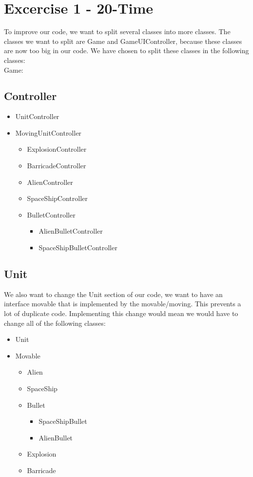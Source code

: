 \section*{Excercise 1 - 20-Time}
To improve our code, we want to split several classes into more classes. The classes we want to split are Game and GameUIController, because these classes are now too big in our code. We have chosen to split these classes in the following classes:\\
Game:\newline
\subsection*{Controller}
\begin{itemize}
	\item UnitController
	\item MovingUnitController
	\begin{itemize}
	\item ExplosionController
	\item BarricadeController	
	\item AlienController
	\item SpaceShipController
	\item BulletController
		\begin{itemize}
			\item AlienBulletController
			\item SpaceShipBulletController
		\end{itemize}
	\end{itemize}
\end{itemize}
\subsection*{Unit}
We also want to change the Unit section of our code, we want to have an interface movable that is implemented by the movable/moving. This prevents a lot of duplicate code. Implementing this change would mean we would have to change all of the following classes:
	\begin{itemize}
	\item Unit
	\item Movable
		\begin{itemize}
		\item Alien
		\item SpaceShip
		\item Bullet
		\begin{itemize}
			\item SpaceShipBullet
			\item AlienBullet
		\end{itemize}
		\item Explosion
		\item Barricade
	\end{itemize}
\end{itemize}
